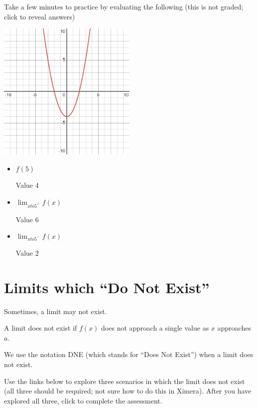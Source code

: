 \documentclass{ximera}
\begin{document}
Take a few minutes to practice by evaluating the following (this is not graded; click to reveal answers)

\includegraphics[width=0.5\textwidth]{graph2.png}

\begin{itemize}
    \item $f(5)$
    \begin{expandable}
        Value $4$
    \end{expandable}
    \item $\lim_{xto5^+} f(x)$
    \begin{foldable}
        Value $6$
    \end{foldable}
    \item $\lim_{xto5^-} f(x)$
    \begin{expandable}
        Value $2$
    \end{expandable}
\end{itemize}

\section{Limits which ``Do Not Exist''}

Sometimes, a limit may not exist.

\begin{explanation}
    A limit does not exist if $f(x)$ does not approach a single value as $x$ approaches $a$.
\end{explanation}

We use the notation DNE (which stands for ``Does Not Exist'') when a limit does not exist.

Use the links below to explore three scenarios in which the limit does not exist (all three should be required; not sure how to do this in Ximera). After you have explored all three, click to complete the assessment.
\end{document}
